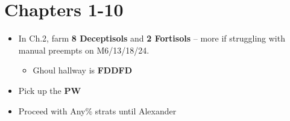 \chapter{Chapters 1-10}

\begin{itemize}
	\item In Ch.2, farm \textbf{8 Deceptisols} and \textbf{2 Fortisols} -- more if struggling with manual preempts on M6/13/18/24.
		\begin{itemize}
			\item Ghoul hallway is \textbf{FDDFD}
		\end{itemize}
	\item Pick up the \textbf{PW}
	\item Proceed with Any\% strats until Alexander
\end{itemize}